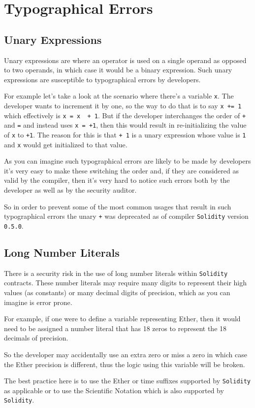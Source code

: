 \section{Typographical Errors}\label{typographical-errors}

\subsection{Unary Expressions}\label{unary-expressions}

Unary expressions are where an operator is used on a single operand as
opposed to two operands, in which case it would be a binary expression.
Such unary expressions are susceptible to typographical errors by
developers.

For example let's take a look at the scenario where there's a variable
\texttt{x}. The developer wants to increment it by one, so the way to do
that is to say \texttt{x\ +=\ 1} which effectively is
\texttt{x\ =\ x\ \ +\ 1}. But if the developer interchanges the order of
\texttt{+} and \texttt{=} and instead uses \texttt{x\ =\ +1}, then this
would result in re-initializing the value of \texttt{x} to \texttt{+1}.
The reason for this is that \texttt{+\ 1} is a unary expression whose
value is \texttt{1} and \texttt{x} would get initialized to that value.

As you can imagine such typographical errors are likely to be made by
developers it's very easy to make these switching the order and, if they
are considered as valid by the compiler, then it's very hard to notice
such errors both by the developer as well as by the security auditor.

So in order to prevent some of the most common usages that result in
such typographical errors the unary \texttt{+} was deprecated as of
compiler \texttt{Solidity} version \texttt{0.5.0}.

\subsection{Long Number Literals}\label{long-number-literals}

There is a security risk in the use of long number literals within
\texttt{Solidity} contracts. These number literals may require many
digits to represent their high values (as constants) or many decimal
digits of precision, which as you can imagine is error prone.

For example, if one were to define a variable representing Ether, then
it would need to be assigned a number literal that has 18 zeros to
represent the 18 decimals of precision.

So the developer may accidentally use an extra zero or miss a zero in
which case the Ether precision is different, thus the logic using this
variable will be broken.

The best practice here is to use the Ether or time suffixes supported by
\texttt{Solidity} as applicable or to use the Scientific Notation which
is also supported by \texttt{Solidity}.
